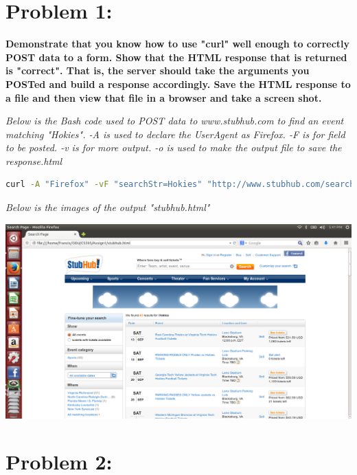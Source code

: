 \documentclass{article}
\begin{document}
         
\section{Problem 1:}
\label{Problem 1}

{\bf Demonstrate that you know how to use "curl" well enough to
correctly POST data to a form.  Show that the HTML response that
is returned is "correct".  That is, the server should take the
arguments you POSTed and build a response accordingly.  Save the
HTML response to a file and then view that file in a browser and
take a screen shot.
\newline
} 

{\it Below is the Bash code used to POST data to www.stubhub.com to find an event matching "Hokies".  -A is used to declare the UserAgent as Firefox.  -F is for field to be posted. -v is for more output. -o is used to make the output file to save the response.html}
\begin{lstlisting}[language=Bash,frame=single,caption=Curl, 
                 label={CUrl}, breaklines=true]
curl -A "Firefox" -vF "searchStr=Hokies" "http://www.stubhub.com/search/doSearch" -o stubhub.html

\end{lstlisting}

{\it Below is the images of the output "stubhub.html"}

\includegraphics[width=\textwidth]{prob1}
\newpage
\section{Problem 2:}
\label{Problem 2}
\end{document}
